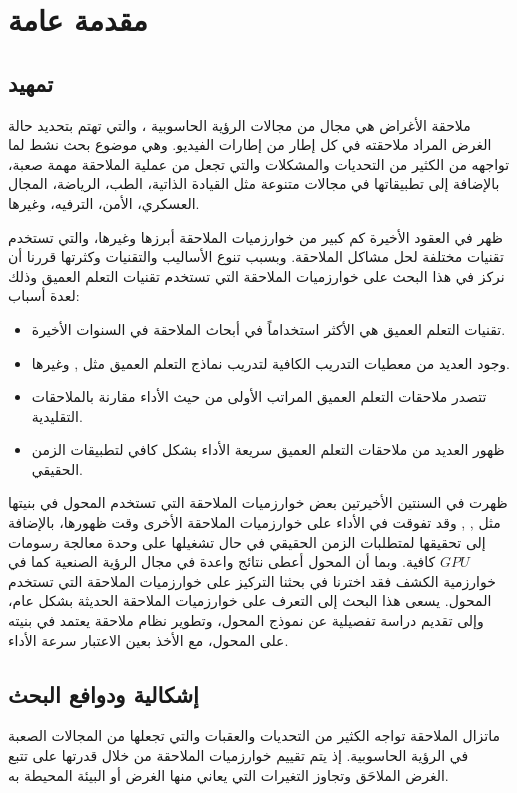 \chapter{مقدمة عامة}
\section{تمهيد}
ملاحقة الأغراض
هي مجال من مجالات الرؤية الحاسوبية
،
والتي تهتم بتحديد حالة الغرض المراد ملاحقته في كل إطار من إطارات الفيديو. وهي موضوع بحث نشط لما تواجهه من الكثير من التحديات والمشكلات والتي تجعل من عملية الملاحقة مهمة صعبة، بالإضافة إلى تطبيقاتها في مجالات متنوعة مثل القيادة الذاتية، الطب، الرياضة، المجال العسكري، الأمن، الترفيه، وغيرها.


ظهر في العقود الأخيرة كم كبير من خوارزميات الملاحقة أبرزها
وغيرها، والتي تستخدم تقنيات مختلفة لحل مشاكل الملاحقة. وبسبب تنوع الأساليب والتقنيات وكثرتها قررنا أن نركز في هذا البحث على خوارزميات الملاحقة التي تستخدم تقنيات التعلم العميق وذلك لعدة أسباب:
\begin{itemize}
	\item
تقنيات التعلم العميق هي الأكثر استخداماً في أبحاث الملاحقة في السنوات الأخيرة.
	\item
وجود العديد من معطيات التدريب الكافية لتدريب نماذج التعلم العميق مثل
,
		وغيرها.
	\item
تتصدر  ملاحقات التعلم العميق المراتب الأولى من حيث الأداء مقارنة بالملاحقات التقليدية.
	\item
ظهور العديد من ملاحقات التعلم العميق سريعة الأداء بشكل كافي لتطبيقات الزمن الحقيقي.
\end{itemize}
ظهرت في السنتين الأخيرتين بعض خوارزميات الملاحقة التي تستخدم المحول 
في بنيتها مثل
,
,
وقد تفوقت في الأداء على خوارزميات الملاحقة الأخرى وقت ظهورها، بالإضافة إلى تحقيقها لمتطلبات الزمن الحقيقي في حال تشغيلها على وحدة معالجة رسومات 
$GPU$
كافية.
وبما أن المحول أعطى نتائج واعدة في مجال الرؤية الصنعية كما في خوارزمية الكشف 
فقد اخترنا في بحثنا التركيز على خوارزميات الملاحقة التي تستخدم المحول.
\newline
يسعى هذا البحث إلى التعرف على خوارزميات الملاحقة الحديثة بشكل عام، وإلى تقديم دراسة تفصيلية عن نموذج المحول، وتطوير نظام ملاحقة يعتمد في بنيته على المحول، مع الأخذ بعين الاعتبار سرعة الأداء.
\section{إشكالية ودوافع البحث}
ماتزال الملاحقة تواجه الكثير من التحديات والعقبات والتي تجعلها من المجالات الصعبة في الرؤية الحاسوبية.
إذ يتم تقييم خوارزميات الملاحقة من خلال قدرتها على تتبع الغرض الملاحَق وتجاوز التغيرات التي يعاني منها الغرض أو البيئة المحيطة به.


